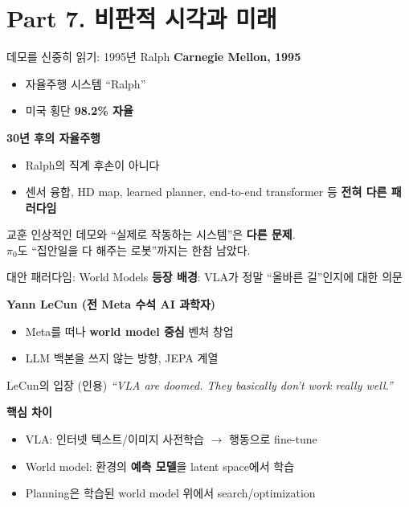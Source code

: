 \documentclass[aspectratio=169,10pt]{beamer}
\begin{document}
\section{Part 7. 비판적 시각과 미래}

\begin{frame}{데모를 신중히 읽기: 1995년 Ralph}
\textbf{Carnegie Mellon, 1995}
\begin{itemize}
  \item 자율주행 시스템 ``Ralph''
  \item 미국 횡단 \textbf{98.2\% 자율}
\end{itemize}

\vspace{0.6em}
\textbf{30년 후의 자율주행}
\begin{itemize}
  \item Ralph의 직계 후손이 아니다
  \item 센서 융합, HD map, learned planner, end-to-end transformer 등 \textbf{전혀 다른 패러다임}
\end{itemize}

\vspace{0.8em}
\begin{alertblock}{교훈}
인상적인 데모와 ``실제로 작동하는 시스템''은 \textbf{다른 문제}.\\
$\pi_0$도 ``집안일을 다 해주는 로봇''까지는 한참 남았다.
\end{alertblock}
\end{frame}

\begin{frame}{대안 패러다임: World Models}
\textbf{등장 배경}: VLA가 정말 ``올바른 길''인지에 대한 의문

\vspace{0.3em}
\textbf{Yann LeCun (전 Meta 수석 AI 과학자)}
\begin{itemize}
  \item Meta를 떠나 \textbf{world model 중심} 벤처 창업
  \item LLM 백본을 쓰지 \alert{않는} 방향, JEPA 계열
\end{itemize}

\vspace{0.3em}
\begin{block}{LeCun의 입장 (인용)}
\textit{``VLA are doomed. They basically don't work really well.''}
\end{block}

\vspace{0.3em}
\textbf{핵심 차이}
\begin{itemize}
  \item VLA: 인터넷 텍스트/이미지 사전학습 $\to$ 행동으로 fine-tune
  \item World model: 환경의 \textbf{예측 모델}을 latent space에서 학습
  \item Planning은 학습된 world model 위에서 search/optimization
\end{itemize}
\end{frame}
\end{document}
